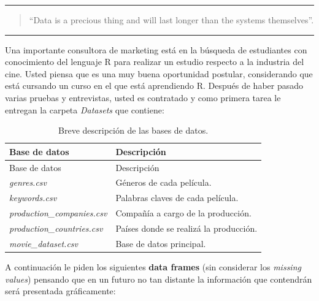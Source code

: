 \documentclass[11pt,]{article}
\begin{document}
\vspace{-8pt}

\begin{center}\rule{0.5\linewidth}{\linethickness}\end{center}

\begin{quote}
``Data is a precious thing and will last longer than the systems
themselves''.

\end{quote}

\vspace{-10pt}

\noindent\rule{\textwidth}{0.5pt}

Una importante consultora de marketing está en la búsqueda de
estudiantes con conocimiento del lenguaje R para realizar un estudio
respecto a la industria del cine. Usted piensa que es una muy buena
oportunidad postular, considerando que está cursando un curso en el que
está aprendiendo R. Después de haber pasado varias pruebas y
entrevistas, usted es contratado y como primera tarea le entregan la
carpeta \emph{Datasets} que contiene:

\begin{longtable}[]{@{}ll@{}}
\caption{Breve descripción de las bases de datos.}\tabularnewline
\toprule
Base de datos & Descripción\tabularnewline
\midrule
\endfirsthead
\toprule
Base de datos & Descripción\tabularnewline
\midrule
\endhead
\emph{genres.csv} & Géneros de cada película.\tabularnewline
\emph{keywords.csv} & Palabras claves de cada película.\tabularnewline
\emph{production\_companies.csv} & Compañía a cargo de la
producción.\tabularnewline
\emph{production\_countries.csv} & Países donde se realizá la
producción.\tabularnewline
\emph{movie\_dataset.csv} & Base de datos principal.\tabularnewline
\bottomrule
\end{longtable}

A continuación le piden los siguientes \textbf{data frames} (sin
considerar los \emph{missing values}) pensando que en un futuro no tan
distante la información que contendrán será presentada gráficamente:
\end{document}
